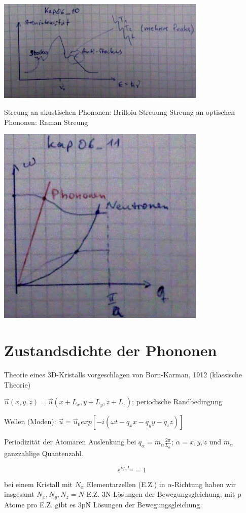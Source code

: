 \includegraphics[width=0.75\textwidth]{kap06_10.png}

Streung an akustischen Phononen: Brilloiu-Streuung
Streung an optischen Phononen: Raman Streung

\includegraphics[width=0.75\textwidth]{kap06_11.png}

\section{Zustandsdichte der Phononen}

Theorie eines 3D-Kristalls vorgeschlagen von Born-Karman, 1912 (klassische Theorie)

\(\vec u (x,y,z) = \vec u (x+L_x,y+L_y,z+L_z)\); periodische Randbedingung

Wellen (Moden): \(\vec u = \vec u_0 exp[-i(\omega t-q_xx-q_yy-q_zz)]\)

Periodizität der Atomaren Auslenkung bei \(q_\alpha = m_\alpha\frac{2\pi}{L_\alpha}\); \(\alpha=x,y,z\) und \(m_\alpha\) ganzzahlige Quantenzahl.

\[ e^{iq_\alpha L_\alpha}=1\]

bei einem Kristall mit \(N_\alpha\) Elementarzellen (E.Z.) in \(\alpha\)-Richtung haben wir insgesamt \(N_x,N_y,N_z=N\) E.Z. 3N Lösungen der Bewegungsgleichung; mit p Atome pro E.Z. gibt es 3pN Lösungen der Bewegungsgleichung.

